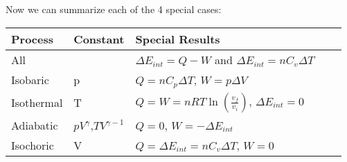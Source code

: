 \documentclass[11pt]{article}
\begin{document}
    \noindent Now we can summarize each of the 4 special cases:
    \begin{table}[h]
        \centering
\renewcommand{\arraystretch}{1.5}
        \begin{tabular}{lp{3cm}lp{6cm}l}
            \toprule
            \textbf{Process} & \textbf{Constant} & \textbf{Special Results} \\
            \midrule
            All & &  $\Delta E_{int} = Q - W$ and $\Delta E_{int} = n C_v \Delta T$\\
            Isobaric  & p  & $Q = nC_p \Delta T$, $W = p \Delta V$\\
            Isothermal & T  & $Q = W = nRT \ln (\frac{v_f}{v_i}) $, $\Delta E_{int} = 0$ \\
            Adiabatic & $pV^{\gamma}$,$TV^{\gamma - 1}$ & $Q = 0$, $W = - \Delta E_{int} $ \\
            Isochoric & V  & $Q = \Delta E_{int} = n C_v \Delta T$, $W = 0$ \\
            \bottomrule
        \end{tabular}
    \end{table}
\end{document}
